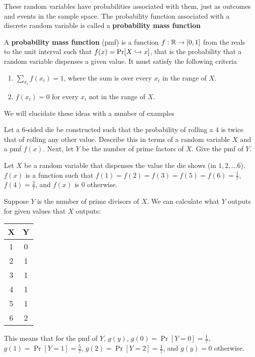 \documentclass[../main.tex]{subfiles}
\begin{document}
These random variables have probabilities associated with them, just as
outcomes and events in the sample space. The probability function
associated with a discrete random variable is called a \textbf{probability
mass function}
\begin{definition}
    A \textbf{probability mass function} (pmf) is a function  $f:\mathbb{R} \rightarrow [0,1]$ from the reals to the unit interval such that $f(x) = \mathrm{Pr}[X \hookrightarrow x]$, that is the probability that
    a random variable dispenses a given value. It must satisfy the following criteria
    \begin{enumerate}
        \item $\displaystyle \sum_{x_i} f(x_i) = 1$, where the sum is over
        every $x_i$ in the range of $X$.
        \item $f(x_i) = 0$ for every $x_i$ not in the range of $X$.
    \end{enumerate}
\end{definition}
We will elucidate these ideas with a number of examples
\begin{example}
    Let a 6-sided die be constructed such that the probability of rolling
    a 4 is twice that of rolling any other value. Describe this in terms
    of a random variable $X$ and a pmf $f(x)$. Next, let $Y$ be the number of
    prime factors of $X$. Give the pmf of $Y$.
\end{example}
\begin{solution}
Let $X$ be a random variable that dispenses the value the die shows (in $1, 2, \ldots 6$). $f(x)$ is a function such that $f(1) = f(2) = f(3) = f(5) = f(6) = \frac{1}{7}$, $f(4) = \frac 27$, and $f(x)$ is 0 otherwise. 

Suppose $Y$ is the number of prime divisors of $X$. We can calculate what $Y$ outputs for given values that $X$ outputs: 
\begin{center}\begin{tabular}{c|c}
     X & Y \\ \hline 
     1 & 0\\
     2 & 1 \\
     3 & 1 \\
     4 & 1 \\
     5 & 1 \\
     6 & 2 
\end{tabular}
\end{center}
This means that for the pmf of $Y$, $g(y)$, $g(0) = \Pr[Y=0] = \frac 17$, $g(1) = \Pr[Y=1] = \frac 57$, $g(2) = \Pr[Y=2] = \frac 17$, and $g(y) = 0$ otherwise. 
\end{solution}
\end{document}
